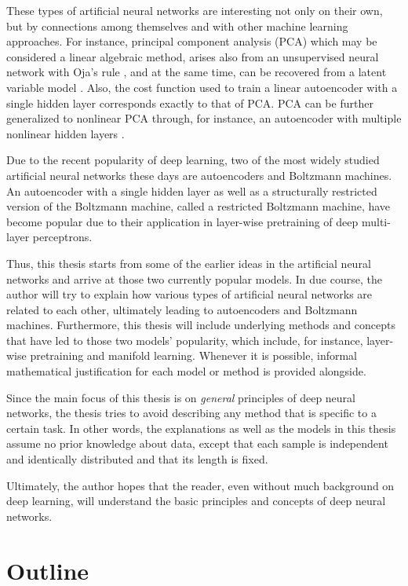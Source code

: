\documentclass[dissertation,nocontribution,draft*]{aaltoseries}
\begin{document}
These types of artificial neural networks are interesting
not only on their own, but by connections among themselves
and with other machine learning approaches. For instance,
principal component analysis
(PCA) which
may be considered a linear algebraic method, arises also
from an unsupervised neural network with Oja's rule
\citep{Oja1982}, and at the same time, can be recovered from
a latent variable model \citep{Tipping1999,Roweis1998}.
Also, the cost function used to train a linear autoencoder
with a single hidden layer corresponds exactly to that of
PCA.  PCA can be further generalized to nonlinear PCA
through, for instance, an autoencoder with multiple
nonlinear hidden layers \citep{Kramer1991,Oja1991}. 

Due to the recent popularity of deep learning, two of the
most widely studied artificial neural networks these days
are autoencoders and Boltzmann machines.  An autoencoder
with a single hidden layer as well as a structurally
restricted version of the Boltzmann machine, called a
restricted Boltzmann machine, have become popular due to
their application in layer-wise pretraining of deep
multi-layer perceptrons. 

Thus, this thesis starts from some of the earlier
ideas in the artificial neural networks and arrive at those
two currently popular models. In due course, the author will
try to explain how various types of artificial neural
networks are related to each other, ultimately leading to
autoencoders and Boltzmann machines. Furthermore, this
thesis will include underlying methods and concepts that
have led to those two models' popularity, which
include, for instance, layer-wise pretraining and manifold
learning. Whenever it is possible, informal mathematical
justification for each model or method is provided
alongside.

Since the main focus of this thesis is on \textit{general}
principles of deep neural networks, the thesis tries to
avoid describing any method that is specific to a certain
task. In other words, the explanations as well as the models
in this thesis assume no prior knowledge about data, except
that each sample is independent and identically distributed
and that its length is fixed. 

Ultimately, the author hopes that the reader, even without
much background on deep learning, will understand the basic
principles and concepts of deep neural networks. 


\section{Outline}
\end{document}
